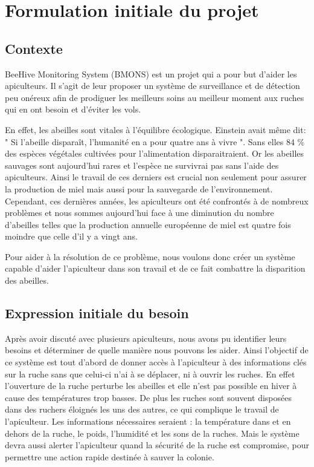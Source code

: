 \chapter{Formulation initiale du projet}



\section{Contexte}

BeeHive Monitoring System (BMONS) est un projet qui a pour but d'aider les apiculteurs. Il s'agit de leur proposer un système de surveillance et de détection peu onéreux afin de prodiguer les meilleurs soins au meilleur moment aux ruches qui en ont besoin et d'éviter les vols.

En effet, les abeilles sont vitales à l'équilibre écologique. Einstein avait même dit: " Si l’abeille disparaît, l’humanité en a pour quatre ans à vivre ". Sans elles 84 \% des espèces végétales cultivées pour l'alimentation disparaitraient. Or les abeilles sauvages sont aujourd'hui rares et l'espèce ne survivrai pas sans l'aide des apiculteurs. Ainsi le travail de ces derniers est crucial non seulement pour assurer la production de miel mais aussi pour la sauvegarde de l'environnement. Cependant, ces dernières années, les apiculteurs ont été confrontés à de nombreux problèmes et nous sommes aujourd'hui face à une diminution du nombre d'abeilles telles que la production annuelle européenne de miel est quatre fois moindre que celle d'il y a vingt ans. 

Pour aider à la résolution de ce problème, nous voulons donc créer un système capable d'aider l'apiculteur dans son travail et de ce fait combattre la disparition des abeilles. 

\section{Expression initiale du besoin}

Après avoir discuté avec plusieurs apiculteurs, nous avons pu identifier leurs besoins et déterminer de quelle manière nous pouvons les aider. Ainsi l'objectif de ce système est tout d'abord de donner accès à l'apiculteur à des informations clés sur la ruche sans que celui-ci n'ai à se déplacer, ni à ouvrir les ruches. En effet l'ouverture de la ruche perturbe les abeilles et elle n'est pas possible en hiver à cause des températures trop basses. De plus les ruches sont souvent disposées dans des ruchers éloignés les uns des autres, ce qui complique le travail de l'apiculteur. Les informations nécessaires seraient : la température dans et en dehors de la ruche, le poids, l'humidité et les sons de la ruches. Mais le système devra aussi alerter l'apiculteur quand la sécurité de la ruche est compromise, pour permettre une action rapide destinée à sauver la colonie.

